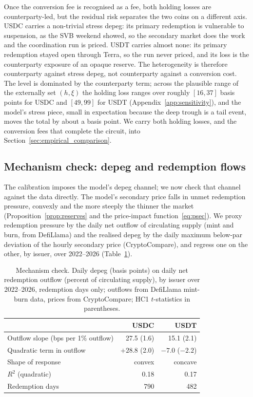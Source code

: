 Once the conversion fee is recognised as a fee, both holding losses are counterparty-led, but the residual risk separates the two coins on a different axis. USDC carries a non-trivial stress depeg: its primary redemption is vulnerable to suspension, as the SVB weekend showed, so the secondary market does the work and the coordination run is priced. USDT carries almost none: its primary redemption stayed open through Terra, so the run never priced, and its loss is the counterparty exposure of an opaque reserve. The heterogeneity is therefore counterparty against stress depeg, not counterparty against a conversion cost. The level is dominated by the counterparty term; across the plausible range of the externally set $(h,\xi)$ the holding loss ranges over roughly $[16,37]$ basis points for USDC and $[49,99]$ for USDT (Appendix~\ref{app:sensitivity}), and the model's stress piece, small in expectation because the deep trough is a tail event, moves the total by about a basis point. We carry both holding losses, and the conversion fees that complete the circuit, into Section~\ref{sec:empirical_comparison}.

\subsection{Mechanism check: depeg and redemption flows}\label{sub:mechanism_check}

The calibration imposes the model's depeg channel; we now check that channel against the data directly. The model's secondary price falls in unmet redemption pressure, convexly and the more steeply the thinner the market (Proposition~\ref{prop:reserves} and the price-impact function~\eqref{eq:psec}). We proxy redemption pressure by the daily net outflow of circulating supply (mint and burn, from DefiLlama) and the realised depeg by the daily maximum below-par deviation of the hourly secondary price (CryptoCompare), and regress one on the other, by issuer, over 2022--2026 (Table~\ref{tab:mechanism_check}).

\begin{table}[H]
\centering
\caption{Mechanism check. Daily depeg (basis points) on daily net redemption outflow (percent of circulating supply), by issuer over 2022--2026, redemption days only; outflows from DefiLlama mint-burn data, prices from CryptoCompare; HC1 $t$-statistics in parentheses.}\label{tab:mechanism_check}
\begin{tabular}{lrr}
\toprule
 & USDC & USDT \\
\midrule
Outflow slope (bps per 1\% outflow) & 27.5 \;(1.6) & 15.1 \;(2.1) \\
Quadratic term in outflow           & $+28.8$ \;(2.0) & $-7.0$ \;($-2.2$) \\
Shape of response                    & convex & concave \\
$R^2$ (quadratic)                    & 0.18 & 0.17 \\
Redemption days                      & 790 & 482 \\
\bottomrule
\end{tabular}
\end{table}

